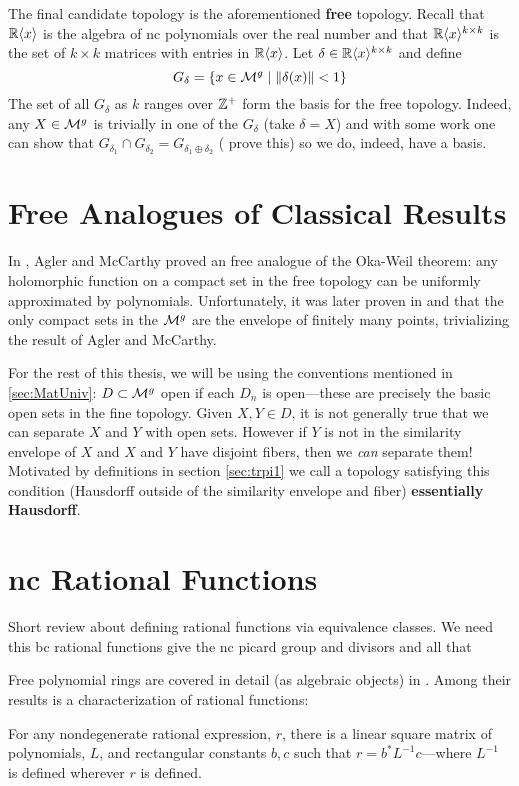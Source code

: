 The final candidate topology is the aforementioned \textbf{free} topology.
Recall that \(\mathbb{R} \langle x \rangle \) is the algebra of nc polynomials over the
real number and that
\(\mathbb{R} \langle x \rangle ^{k\times k}\) is the set of \(k \times k\) matrices
with entries in \(\mathbb{R} \langle x \rangle \). Let
\(\delta \in \mathbb{R} \langle x \rangle ^{k\times k}\) and define
\[
  G_\delta = \{x \in \mathcal{M}^{g} \mid \| \delta(x) \| <1\}
\]
The set of all \(G_\delta\) as \(k\) ranges over \(\mathbb{Z} ^+\) form the basis for
the free topology. Indeed, any \(X \in \mathcal{M}^{g} \) is trivially in one of the
\(G_\delta\) (take \(\delta=X\)) and with some work one can show that
\(G_{\delta_1} \cap G_{\delta_2}= G_{\delta_1\oplus \delta_2}\) ({\color{red}
  prove this}) so we do,
indeed, have a basis.

\section{Free Analogues of Classical Results}%
\label{sec:freeanal}



In \cite{aglerGlobal2013}, Agler and McCarthy proved an free analogue of the
Oka-Weil theorem: any holomorphic function on a compact set in the free topology
can be uniformly approximated by polynomials. Unfortunately, it was later proven
in \cite{pascoeentire2019} and \cite{augatCompact2017} that the only compact
sets in the \(\mathcal{M}^{g} \) are the envelope of finitely many points, trivializing
the result of Agler and McCarthy.

For the rest of this thesis, we will be using the conventions mentioned in
\cref{sec:MatUniv}: \( D \subset\mathcal{M}^{g} \) open if each \(D_n\) is open---these
are precisely the basic open sets in the fine topology.
Given \(X,Y \in D\), it is not generally true that we can separate \(X\) and
\(Y\) with open sets. However if \(Y\) is not in the similarity envelope of
\(X\) and \(X\) and \(Y\) have disjoint fibers, then we \emph{can} separate
them! Motivated by definitions in section \ref{sec:trpi1} we call a topology
satisfying this condition (Hausdorff outside of the similarity envelope and
fiber) \textbf{essentially Hausdorff}.

\section{nc Rational Functions}%
\label{sec:ncrational}

{\color{blue} Short review about defining rational functions via equivalence
  classes. We need this bc rational functions give the nc picard group and
  divisors and all that }



Free polynomial rings are covered in detail (as algebraic objects) in
\cite{cohnFree2006}. Among
their results is a characterization of rational functions:

\begin{theorem}
\label{thm:ratchar}
  For any nondegenerate
  rational expression, \(r\), there is a linear square matrix of polynomials, \(L\), and
  rectangular constants \(b,c\) such that \(r=b^*L ^{-1}c\)---where \(L ^{-1}\) is
  defined wherever \(r\) is defined.
\end{theorem}
